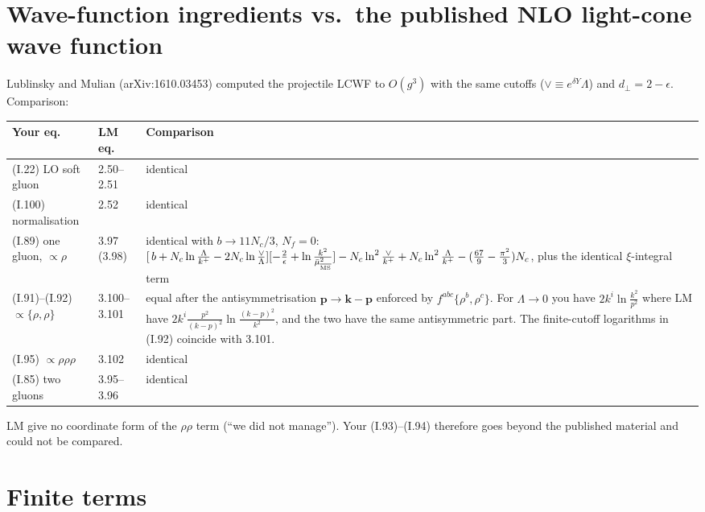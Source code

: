 \documentclass[10pt]{article}
\newcommand{\mub}{\bar\mu_{\overline{\rm MS}}}
\begin{document}
\section{Wave-function ingredients vs.\ the published NLO light-cone wave function}\label{sec:wf}
Lublinsky and Mulian (arXiv:1610.03453) computed the projectile LCWF to $O(g^3)$ with the same cutoffs
($\vee\equiv e^{\delta Y}\Lambda$) and $d_\perp=2-\epsilon$. Comparison:
\begin{center}
\begin{tabular}{p{3.6cm}p{3.2cm}p{8.2cm}}
\toprule
Your eq. & LM eq. & Comparison\\
\midrule
(I.22) LO soft gluon & 2.50--2.51 & identical\\
(I.100) normalisation & 2.52 & identical\\
(I.89) one gluon, $\propto\rho$ & 3.97 (3.98) & identical with $b\to11N_c/3$, $N_f=0$: $[\,b+N_c\ln\frac{\Lambda}{k^+}-2N_c\ln\frac{\vee}{\Lambda}][-\frac2\epsilon+\ln\frac{k^2}{\mub^2}]-N_c\ln^2\frac{\vee}{k^+}+N_c\ln^2\frac{\Lambda}{k^+}-(\frac{67}{9}-\frac{\pi^2}{3})N_c$, plus the identical $\xi$-integral term\\
(I.91)--(I.92) $\propto\{\rho,\rho\}$ & 3.100--3.101 & equal after the antisymmetrisation $\mathbf p\to\mathbf k-\mathbf p$ enforced by $f^{abc}\{\rho^b,\rho^c\}$. For $\Lambda\to0$ you have $2k^i\ln\frac{k^2}{p^2}$ where LM have $2k^i\frac{p^2}{(k-p)^2}\ln\frac{(k-p)^2}{k^2}$, and the two have the same antisymmetric part. The finite-cutoff logarithms in (I.92) coincide with 3.101.\\
(I.95) $\propto\rho\rho\rho$ & 3.102 & identical\\
(I.85) two gluons & 3.95--3.96 & identical\\
\bottomrule
\end{tabular}
\end{center}
LM give no coordinate form of the $\rho\rho$ term (``we did not manage''). Your (I.93)--(I.94) therefore goes beyond the published
material and could not be compared.

\section{Finite terms}\label{sec:finite}
\end{document}
